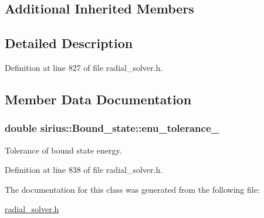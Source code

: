 \subsection*{Additional Inherited Members}


\subsection{Detailed Description}


Definition at line 827 of file radial\+\_\+solver.\+h.



\subsection{Member Data Documentation}
\hypertarget{classsirius_1_1_bound__state_ab77aa89bd55cf2acd87c03514c47e4d5}{}
\subsubsection[{enu\+\_\+tolerance\+\_\+}]{\setlength{\rightskip}{0pt plus 5cm}double sirius\+::\+Bound\+\_\+state\+::enu\+\_\+tolerance\+\_\+\hspace{0.3cm}{\ttfamily [private]}}\label{classsirius_1_1_bound__state_ab77aa89bd55cf2acd87c03514c47e4d5}


Tolerance of bound state energy. 



Definition at line 838 of file radial\+\_\+solver.\+h.



The documentation for this class was generated from the following file\+:\begin{DoxyCompactItemize}
\item 
\hyperlink{radial__solver_8h}{radial\+\_\+solver.\+h}\end{DoxyCompactItemize}
